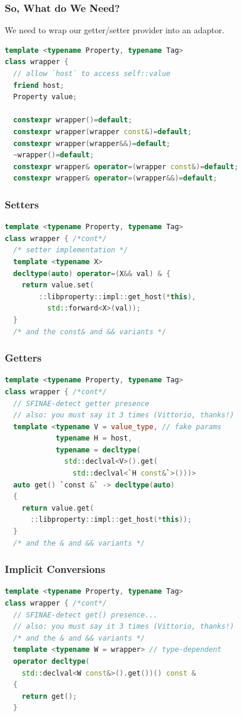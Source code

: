 \documentclass{beamer}
\begin{document}
\begin{frame}[fragile]
\frametitle{So, What do We Need?}
\begin{center}
  We need to wrap our getter/setter provider into an adaptor.
\end{center}
\begin{lstlisting}[language=cpp]
template <typename Property, typename Tag>
class wrapper {
  // allow `host` to access self::value
  friend host;
  Property value;

  constexpr wrapper()=default;
  constexpr wrapper(wrapper const&)=default;
  constexpr wrapper(wrapper&&)=default;
  ~wrapper()=default;
  constexpr wrapper& operator=(wrapper const&)=default;
  constexpr wrapper& operator=(wrapper&&)=default;
\end{lstlisting}
\end{frame}


\begin{frame}[fragile]
\frametitle{Setters}
\begin{lstlisting}[language=cpp]
template <typename Property, typename Tag>
class wrapper { /*cont*/
  /* setter implementation */
  template <typename X>
  decltype(auto) operator=(X&& val) & {
    return value.set(
        ::libproperty::impl::get_host(*this),
          std::forward<X>(val));
  }
  /* and the const& and && variants */
\end{lstlisting}
\end{frame}

\begin{frame}[fragile]
\frametitle{Getters}
\begin{lstlisting}[language=cpp]
template <typename Property, typename Tag>
class wrapper { /*cont*/
  // SFINAE-detect getter presence
  // also: you must say it 3 times (Vittorio, thanks!)
  template <typename V = value_type, // fake params
            typename H = host,
            typename = decltype(
              std::declval<V>().get(
                std::declval<`H const&`>()))>
  auto get() `const &` -> decltype(auto)
  {
    return value.get(
      ::libproperty::impl::get_host(*this));
  }
  /* and the & and && variants */
\end{lstlisting}
\end{frame}


\begin{frame}[fragile]
\frametitle{Implicit Conversions}
\begin{lstlisting}[language=cpp]
template <typename Property, typename Tag>
class wrapper { /*cont*/
  // SFINAE-detect get() presence...
  // also: you must say it 3 times (Vittorio, thanks!)
  /* and the & and && variants */
  template <typename W = wrapper> // type-dependent
  operator decltype(
    std::declval<W const&>().get())() const &
  {
    return get();
  }
\end{lstlisting}
\end{frame}
\end{document}
